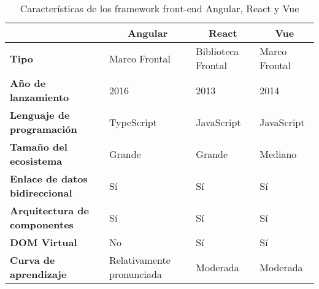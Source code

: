 \begin{spacing}{1}
    \begin{center}

        \renewcommand*{\arraystretch}{1.4}
        \begin{longtable}[c]{ |>{\bfseries}p{} |p{} |p{}  |p{}|  }
            \caption[Características de los framework front-end Angular, React y Vue]{ Características de los framework front-end Angular, React y Vue\cite{universitat_politecnica_de_valencia_universitat_2014} } \\
            \hline
            \multicolumn{1}{|c|}{ \textbf{Característica}} & \multicolumn{1}{c|}{\textbf{Angular}} & \multicolumn{1}{c|}{ \textbf{React}} & \multicolumn{1}{c|}{ \textbf{Vue}} \\
            \hline
            Tipo                                         & Marco Frontal                        & Biblioteca Frontal                  & Marco Frontal                     \\
            \hline
            Año de lanzamiento                           & 2016                                 & 2013                                & 2014                              \\
            \hline
            Lenguaje de programación                     & TypeScript                           & JavaScript                          & JavaScript                        \\
            \hline
            Tamaño del ecosistema                        & Grande                               & Grande                              & Mediano                           \\
            \hline
            Enlace de datos bidireccional                & Sí                                   & Sí                                  & Sí                                \\
            \hline
            Arquitectura de componentes                  & Sí                                   & Sí                                  & Sí                                \\
            \hline
            DOM Virtual                                  & No                                   & Sí                                  & Sí                                \\
            \hline
            Curva de aprendizaje                         & Relativamente pronunciada            & Moderada                            & Moderada                          \\

\end{longtable}
\end{center}
\end{spacing}
